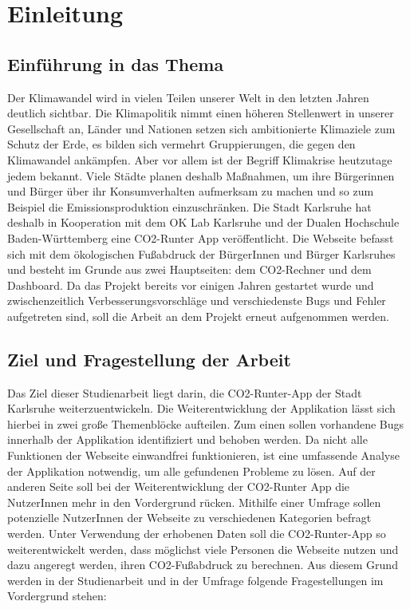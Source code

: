 
\chapter{Einleitung}
\label{chapter:1}

\section{Einführung in das Thema}

Der Klimawandel wird in vielen Teilen unserer Welt in den letzten Jahren deutlich sichtbar.
Die Klimapolitik nimmt einen höheren Stellenwert in unserer Gesellschaft an, Länder und Nationen setzen sich ambitionierte Klimaziele zum Schutz der Erde, es bilden sich vermehrt Gruppierungen, die gegen den Klimawandel ankämpfen. Aber vor allem ist der Begriff Klimakrise heutzutage jedem bekannt. Viele Städte planen deshalb Maßnahmen, um ihre Bürgerinnen und Bürger über ihr Konsumverhalten aufmerksam zu machen und so zum Beispiel die Emissionsproduktion einzuschränken. Die Stadt Karlsruhe hat deshalb in Kooperation mit dem OK Lab Karlsruhe und der Dualen Hochschule Baden-Württemberg eine CO2-Runter App veröffentlicht. Die Webseite befasst sich mit dem ökologischen Fußabdruck der BürgerInnen und Bürger Karlsruhes und besteht im Grunde aus zwei Hauptseiten: dem CO2-Rechner und dem Dashboard. Da das Projekt bereits vor einigen Jahren gestartet wurde und zwischenzeitlich Verbesserungsvorschläge und verschiedenste Bugs und Fehler aufgetreten sind, soll die Arbeit an dem Projekt erneut aufgenommen werden.

\section{Ziel und Fragestellung der Arbeit}

Das Ziel dieser Studienarbeit liegt darin, die CO2-Runter-App der Stadt Karlsruhe weiterzuentwickeln. Die Weiterentwicklung der Applikation lässt sich hierbei in zwei große Themenblöcke aufteilen. Zum einen sollen vorhandene Bugs innerhalb der Applikation identifiziert und behoben werden. Da nicht alle Funktionen der Webseite einwandfrei funktionieren, ist eine umfassende Analyse der Applikation notwendig, um alle gefundenen Probleme zu lösen. Auf der anderen Seite soll bei der Weiterentwicklung der CO2-Runter App die NutzerInnen mehr in den Vordergrund rücken. Mithilfe einer Umfrage sollen potenzielle NutzerInnen der Webseite zu verschiedenen Kategorien befragt werden. Unter Verwendung der erhobenen Daten soll die CO2-Runter-App so weiterentwickelt werden, dass möglichst viele Personen die Webseite nutzen und dazu angeregt werden, ihren CO2-Fußabdruck zu berechnen. Aus diesem Grund werden in der Studienarbeit und in der Umfrage folgende Fragestellungen im Vordergrund stehen:

